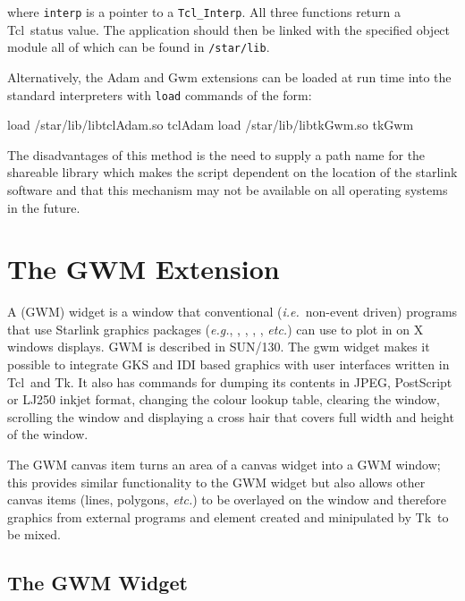 \documentclass[twoside,11pt,nolof]{starlink}
\providecommand{\Tcl}{{\textsf{Tcl}}}
\providecommand{\Tk}{{\textsf{Tk}}}
\begin{document}
where {\tt{interp}} is a pointer to a {\tt{Tcl\_Interp}}. All three functions
return a \Tcl\ status value. The application should then be linked with the
specified object module all of which can be found in {\tt{/star/lib}}.

Alternatively,
the Adam and Gwm extensions can be loaded at run time into
the standard interpreters with {\tt{load}} commands of the form:
\begin{terminalv}
load /star/lib/libtclAdam.so tclAdam
load /star/lib/libtkGwm.so tkGwm
\end{terminalv}

The disadvantages of this method is the need to supply a path name for
the shareable library which makes the script dependent on the location
of the starlink software and that this mechanism may not be available
on all operating systems in the future.

\section{\label{gwm_extension}The GWM Extension}

A  (GWM) widget is a window that
conventional ({\em{i.e.}}\ non-event driven) programs that use
Starlink graphics packages ({\em{e.g.}},
,
,
,
,
 {\em{etc.}}) can use
to plot in on X windows displays. GWM is described in SUN/130. The gwm widget
makes it possible to integrate GKS and IDI based graphics with user interfaces
written in \Tcl\ and \Tk.  It also has commands for dumping its contents
in JPEG, PostScript or LJ250 inkjet format, changing the colour lookup table,
clearing the window, scrolling the window  and displaying a cross hair
that covers full width and height of the window.

The GWM canvas item turns an area of a canvas widget into a GWM window;
this provides similar functionality to the GWM widget but also allows
other canvas items (lines, polygons, {\em{etc.}}) to be overlayed on
the window and therefore graphics from external programs and element
created and minipulated by \Tk\ to be mixed.

\subsection{\label{gwm_widget}The GWM Widget}
\end{document}
